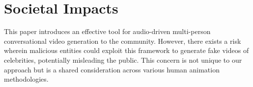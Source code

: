 \documentclass{article}
\begin{document}




\section{Societal Impacts}

This paper introduces an effective tool for audio-driven multi-person conversational video generation to the community. However, there exists a risk wherein malicious entities could exploit this framework to generate fake videos of celebrities, potentially misleading the public. This concern is not unique to our approach but is a shared consideration across various human animation methodologies.


\end{document}
